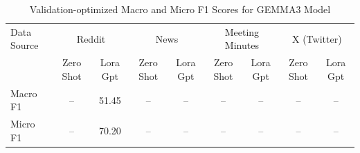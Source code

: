 \begin{table}[htbp]
\centering
\begin{tabular}{l *{8}{c}}
\toprule
Data Source & \multicolumn{2}{c}{Reddit} & \multicolumn{2}{c}{News} & \multicolumn{2}{c}{Meeting Minutes} & \multicolumn{2}{c}{X (Twitter)} \\
& Zero Shot & Lora Gpt & Zero Shot & Lora Gpt & Zero Shot & Lora Gpt & Zero Shot & Lora Gpt \\
\midrule
Macro F1 & -- & 51.45 & -- & -- & -- & -- & -- & -- \\
Micro F1 & -- & 70.20 & -- & -- & -- & -- & -- & -- \\
\bottomrule
\end{tabular}
\centering\caption{Validation-optimized Macro and Micro F1 Scores for GEMMA3 Model}
\label{tab:gemma3_macro_micro}
\end{table}